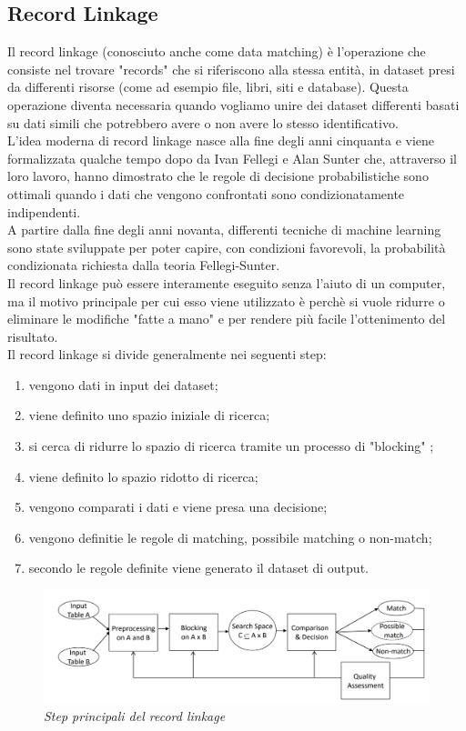 \documentclass[a4paper,12pt]{article}
\begin{document}
\subsection{Record Linkage}

Il record linkage (conosciuto anche come data matching) è l'operazione che consiste nel trovare "records" che si riferiscono alla stessa entità, in dataset presi da differenti risorse (come ad esempio file, libri, siti e database). 
Questa operazione diventa necessaria quando vogliamo unire dei dataset differenti basati su dati simili che potrebbero avere o non avere lo stesso identificativo. \\
L'idea moderna di record linkage nasce alla fine degli anni cinquanta e viene formalizzata qualche tempo dopo da Ivan Fellegi e Alan Sunter \cite{fellegi69} che, attraverso il loro lavoro, hanno dimostrato che le regole di decisione probabilistiche sono ottimali quando i dati che vengono confrontati sono condizionatamente indipendenti. \\
A partire dalla fine degli anni novanta, differenti tecniche di machine learning sono state sviluppate per poter capire, con condizioni favorevoli, la probabilità condizionata richiesta dalla teoria Fellegi-Sunter. \\
Il record linkage può essere interamente eseguito senza l'aiuto di un computer, ma il motivo principale per cui esso viene utilizzato è perchè si vuole ridurre o eliminare le modifiche "fatte a mano" e per rendere più facile l'ottenimento del risultato. 
\\

\noindent Il record linkage si divide generalmente nei seguenti step:
\begin{enumerate}
\item vengono dati in input dei dataset;
\item viene definito uno spazio iniziale di ricerca;
\item si cerca di ridurre lo spazio di ricerca tramite un processo di "blocking" ;
\item viene definito lo spazio ridotto di ricerca;
\item vengono comparati i dati e viene presa una decisione;
\item vengono definitie le regole di matching, possibile matching o non-match;
\item secondo le regole definite viene generato il dataset di output.
\end{enumerate}

\begin{figure}[H]
	\centering
	\includegraphics[width=0.8\linewidth]{img/recordlinkage.png}
	\caption{\textit{Step principali del record linkage}}
\end{figure}
\end{document}
